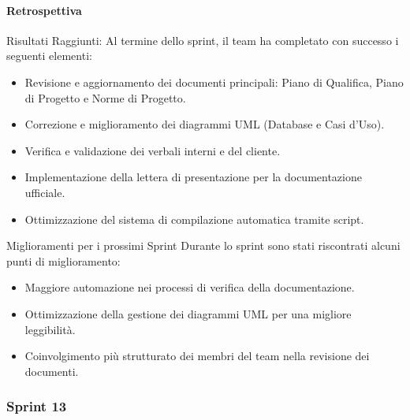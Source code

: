 \documentclass{article}
\begin{document}
                \paragraph{Retrospettiva}
                Risultati Raggiunti:
                Al termine dello sprint, il team ha completato con successo i seguenti elementi:
                \begin{itemize}
                    \item Revisione e aggiornamento dei documenti principali: Piano di Qualifica, Piano di Progetto e Norme di Progetto.
                    \item Correzione e miglioramento dei diagrammi UML (Database e Casi d'Uso).
                    \item Verifica e validazione dei verbali interni e del cliente.
                    \item Implementazione della lettera di presentazione per la documentazione ufficiale.
                    \item Ottimizzazione del sistema di compilazione automatica tramite script.
                \end{itemize}
                
                Miglioramenti per i prossimi Sprint
                Durante lo sprint sono stati riscontrati alcuni punti di miglioramento:
                \begin{itemize}
                    \item Maggiore automazione nei processi di verifica della documentazione.
                    \item Ottimizzazione della gestione dei diagrammi UML per una migliore leggibilità.
                    \item Coinvolgimento più strutturato dei membri del team nella revisione dei documenti.
                \end{itemize}
            \subsubsection{Sprint 13}
\end{document}
